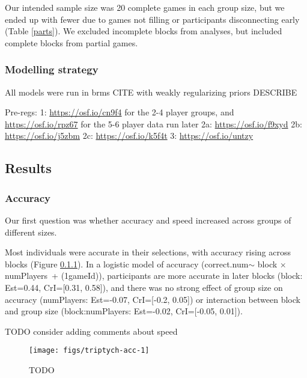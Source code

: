 \documentclass[
  english,
  a4paper,
]{article}
\begin{document}
Our intended sample size was 20 complete games in each group size, but we ended up with fewer due to games not filling or participants disconnecting early (Table \ref{parts}). We excluded incomplete blocks from analyses, but included complete blocks from partial games.

\hypertarget{modelling-strategy}{%
\subsubsection{Modelling strategy}\label{modelling-strategy}}

All models were run in brms CITE with weakly regularizing priors DESCRIBE

Pre-regs:
1: \url{https://osf.io/cn9f4} for the 2-4 player groups, and \url{https://osf.io/rpz67} for the 5-6 player data run later
2a: \url{https://osf.io/f9xyd}
2b: \url{https://osf.io/j5zbm}
2c: \url{https://osf.io/k5f4t}
3: \url{https://osf.io/untzy}

\hypertarget{results}{%
\subsection{Results}\label{results}}

\hypertarget{accuracy}{%
\subsubsection{Accuracy}\label{accuracy}}

Our first question was whether accuracy and speed increased across groups of different sizes.

Most individuals were accurate in their selections, with accuracy rising across blocks (Figure \ref{accuracy}). In a logistic model of accuracy (correct.num\(\sim\) block \(\times\) numPlayers~+ (1\textbar gameId)), participants are more accurate in later blocks (block: Est=0.44, CrI={[}0.31, 0.58{]}), and there was no strong effect of group size on accuracy (numPlayers: Est=-0.07, CrI={[}-0.2, 0.05{]}) or interaction between block and group size (block:numPlayers: Est=-0.02, CrI={[}-0.05, 0.01{]}).

TODO consider adding comments about speed

\begin{figure*}[t!]

{\centering \texttt{[image: figs/triptych-acc-1]} 

}

\caption{TODO}\label{fig:triptych-acc}
\end{figure*}
\end{document}
